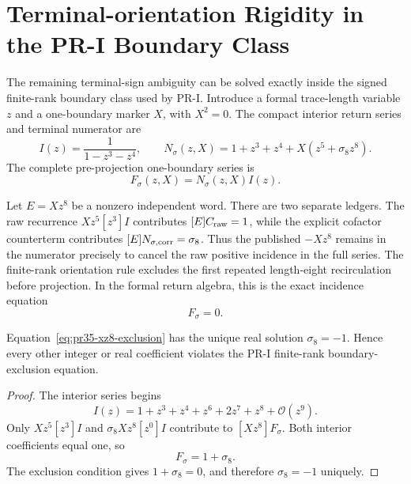 \section{Terminal-orientation Rigidity in the PR-I Boundary Class}
\label{app:terminal-orientation-rigidity}

The remaining terminal-sign ambiguity can be solved exactly inside the signed finite-rank boundary class used by PR-I.  Introduce a formal trace-length
variable $z$ and a one-boundary marker $X$, with $X^2=0$.  The compact interior
return series and terminal numerator are
\begin{equation}
 I(z)=\frac{1}{1-z^3-z^4},
 \qquad
 N_{\sigma}(z,X)=1+z^3+z^4+X(z^5+\sigma_8z^8).
\end{equation}
The complete pre-projection one-boundary series is
\begin{equation}
 F_{\sigma}(z,X)=N_{\sigma}(z,X)I(z).
 \label{eq:pr35-full-boundary-return-series}
\end{equation}

Let $E=Xz^8$ be a nonzero independent word.  There are two separate ledgers.
The raw recurrence $Xz^5[z^3]I$ contributes $[E]C_{\rm raw}=1$, while the
explicit cofactor counterterm contributes $[E]N_{\sigma,\rm corr}=\sigma_8$.
Thus the published $-Xz^8$ remains in the numerator precisely to cancel the
raw positive incidence in the full series. The finite-rank orientation rule excludes the first repeated length-eight recirculation before projection.  In the formal return algebra, this is the exact incidence equation
\begin{equation}
 [Xz^8]F_{\sigma}=0.
 \label{eq:pr35-xz8-exclusion}
\end{equation}

\begin{theorem}
Equation~\eqref{eq:pr35-xz8-exclusion} has the unique real solution $\sigma_8=-1$.  Hence every other integer or real coefficient violates the PR-I finite-rank boundary-exclusion equation.
\end{theorem}

\begin{proof}
The interior series begins
\begin{equation}
 I(z)=1+z^3+z^4+z^6+2z^7+z^8+\mathcal O(z^9).
\end{equation}
Only $Xz^5[z^3]I$ and $\sigma_8Xz^8[z^0]I$ contribute to $[Xz^8]F_{\sigma}$.
Both interior coefficients equal one, so
\begin{equation}
 [Xz^8]F_{\sigma}=1+\sigma_8.
\end{equation}
The exclusion condition gives $1+\sigma_8=0$, and therefore
$\sigma_8=-1$ uniquely.
\end{proof}

